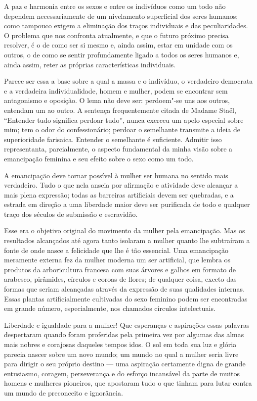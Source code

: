 A paz e harmonia entre os sexos e entre os indivíduos como um todo não
dependem necessariamente de um nivelamento superficial dos seres
humanos; como tampouco exigem a eliminação dos traços individuais e das
peculiaridades. O problema que nos confronta atualmente, e que o futuro
próximo precisa resolver, é o de como ser si mesmo e, ainda assim, estar
em unidade com os outros, o de como se sentir profundamente ligado a
todos os seres humanos e, ainda assim, reter as próprias características
individuais.

Parece ser essa a base sobre a qual a massa e o indivíduo, o
verdadeiro democrata e a verdadeira individualidade, homem e mulher, podem se
encontrar sem antagonismo e oposição. O lema não deve ser: perdoem"-se
uns aos outros, entendam um ao outro. A sentença frequentemente citada
de Madame Staël, ``Entender tudo significa perdoar tudo'', nunca exerceu
um apelo especial sobre mim; tem o odor do confessionário; perdoar o
semelhante transmite a ideia de superioridade farisaica. Entender o
semelhante é suficiente. Admitir isso representanta,
parcialmente, o aspecto fundamental da minha visão sobre a emancipação feminina
e seu efeito sobre o sexo como um todo.

A emancipação deve tornar possível à mulher ser humana no sentido mais
verdadeiro. Tudo o que nela anseia por afirmação e atividade deve
alcançar a mais plena expressão; todas as barreiras artificiais devem
ser quebradas, e a estrada em direção a uma liberdade maior deve ser
purificada de todo e qualquer traço dos séculos de submissão e
escravidão.

Esse era o objetivo original do movimento da mulher pela emancipação.
Mas os resultados alcançados até agora tanto isolaram a mulher quanto
lhe subtraíram a fonte de onde nasce a felicidade que lhe é tão essencial.
Uma emancipação meramente externa fez da mulher moderna um ser
artificial, que lembra os produtos da arboricultura francesa com suas
árvores e galhos em formato de arabesco, pirâmides, círculos e coroas de
flores; de qualquer coisa, exceto das formas que seriam alcançadas
através da expressão de suas qualidades internas. Essas plantas
artificialmente cultivadas do sexo feminino podem ser encontradas em
grande número, especialmente, nos chamados círculos intelectuais. %

Liberdade e igualdade para a mulher! Que esperanças e aspirações essas
palavras despertaram quando foram proferidas pela primeira vez por
algumas das almas mais nobres e corajosas daqueles tempos idos. O sol em
toda sua luz e glória parecia nascer sobre um novo mundo; um mundo no
qual a mulher seria livre para dirigir o seu próprio destino --- uma
aspiração certamente digna de grande entusiasmo, coragem, perseverança e
do esforço incansável da parte de muitos homens e mulheres pioneiros,
que apostaram tudo o que tinham para lutar contra um mundo de
preconceito e ignorância.

